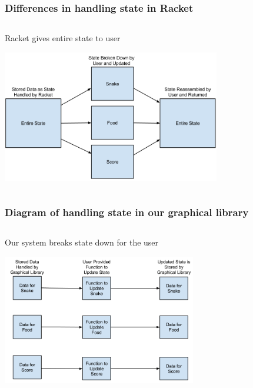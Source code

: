 \documentclass{beamer}
\begin{document}
\begin{frame}
\frametitle{Differences in handling state in Racket}
\begin{columns}[T]
\begin{column}{.95\textwidth}
\begin{block}{Racket gives entire state to user}
\begin{center}
\includegraphics[width=270pt]{Rackets_State_Diagram}
\end{center}
\end{block}
\end{column}
\end{columns}
\end{frame}

\begin{frame}
\frametitle{Diagram of handling state in our graphical library}
\begin{columns}[T]
\begin{column}{.95\textwidth}
\begin{block}{Our system breaks state down for the user}
\begin{center}
\includegraphics[width=240pt]{Handling_State_in_Graphical_Library}
\end{center}
\end{block}
\end{column}
\end{columns}
\end{frame}
\end{document}
